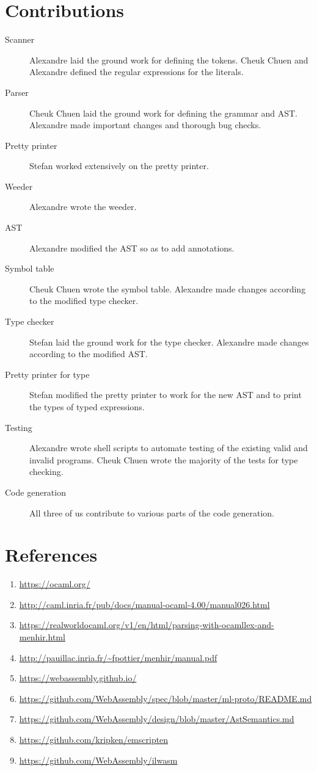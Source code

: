 \documentclass{article}
\begin{document}
\section{Contributions}
\begin{description}
  \item [Scanner] Alexandre laid the ground work for defining the tokens. Cheuk Chuen and Alexandre defined the regular expressions for the literals.
  \item [Parser] Cheuk Chuen laid the ground work for defining the grammar and AST. Alexandre made important changes and thorough bug checks.
  \item [Pretty printer] Stefan worked extensively on the pretty printer.
  \item [Weeder] Alexandre wrote the weeder.
  \item [AST] Alexandre modified the AST so as to add annotations.
  \item [Symbol table] Cheuk Chuen wrote the symbol table. Alexandre made changes according to the modified type checker.
  \item [Type checker] Stefan laid the ground work for the type checker. Alexandre made changes according to the modified AST.
  \item [Pretty printer for type] Stefan modified the pretty printer to work for the new AST and to print the types of typed expressions.
  \item [Testing] Alexandre wrote shell scripts to automate testing of the existing valid and invalid programs. Cheuk Chuen wrote the majority of the tests for type checking.
  \item [Code generation] All three of us contribute to various parts of the code generation.
\end{description}

\section{References}
\begin{enumerate}
  \item \url{https://ocaml.org/}
  \item \url{http://caml.inria.fr/pub/docs/manual-ocaml-4.00/manual026.html}
  \item \url{https://realworldocaml.org/v1/en/html/parsing-with-ocamllex-and-menhir.html}
  \item \url{http://pauillac.inria.fr/~fpottier/menhir/manual.pdf}
  \item \url{https://webassembly.github.io/}
  \item \url{https://github.com/WebAssembly/spec/blob/master/ml-proto/README.md}
  \item \url{https://github.com/WebAssembly/design/blob/master/AstSemantics.md}
  \item \url{https://github.com/kripken/emscripten}
  \item \url{https://github.com/WebAssembly/ilwasm}
\end{enumerate}
\end{document}
